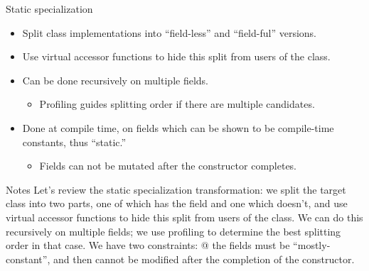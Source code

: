 \documentclass[%
pdf,
colorBG,
slideColor,
nototal,
oqe
]{prosper}
\newenvironment{talknotes}{\begin{slide}{Notes}\tiny}{\end{slide}}
\begin{document}
\begin{slide}{Static specialization}
\begin{itemize}
\item Split class implementations into ``field-less'' and
  ``field-ful'' versions.
\item Use virtual accessor functions to hide this split from users of
  the class.
\item Can be done recursively on multiple fields.
\begin{itemize}
\item Profiling guides splitting order if there are multiple candidates.
\end{itemize}
\item Done at compile time, on fields which can be shown to be
  compile-time constants, thus ``static.''
\begin{itemize}
\item Fields can not be mutated after the constructor completes.
\end{itemize}
\end{itemize}
\end{slide}

\begin{talknotes}
Let's review the static specialization transformation:  we split the
target class into two parts, one of which has the field and one which
doesn't, and use virtual accessor functions to hide this split from
users of the class.  
We can do this recursively on multiple fields; we use profiling to
determine the best splitting order in that case.
We have two constraints: @ the fields must be
``mostly-constant'', and then cannot be modified after the completion
of the constructor.
\end{talknotes}

\end{document}
